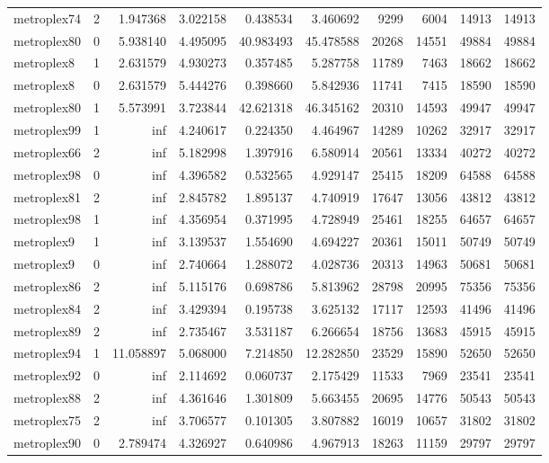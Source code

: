 \begin{longtable}{|l|r|r|r|r|r|r|r|r|r|}
metroplex74 & 2 & 1.947368 & 3.022158 & 0.438534 & 3.460692 & 9299 & 6004 & 14913 & 14913 \\
metroplex80 & 0 & 5.938140 & 4.495095 & 40.983493 & 45.478588 & 20268 & 14551 & 49884 & 49884 \\
metroplex8 & 1 & 2.631579 & 4.930273 & 0.357485 & 5.287758 & 11789 & 7463 & 18662 & 18662 \\
metroplex8 & 0 & 2.631579 & 5.444276 & 0.398660 & 5.842936 & 11741 & 7415 & 18590 & 18590 \\
metroplex80 & 1 & 5.573991 & 3.723844 & 42.621318 & 46.345162 & 20310 & 14593 & 49947 & 49947 \\
metroplex99 & 1 & inf & 4.240617 & 0.224350 & 4.464967 & 14289 & 10262 & 32917 & 32917 \\
metroplex66 & 2 & inf & 5.182998 & 1.397916 & 6.580914 & 20561 & 13334 & 40272 & 40272 \\
metroplex98 & 0 & inf & 4.396582 & 0.532565 & 4.929147 & 25415 & 18209 & 64588 & 64588 \\
metroplex81 & 2 & inf & 2.845782 & 1.895137 & 4.740919 & 17647 & 13056 & 43812 & 43812 \\
metroplex98 & 1 & inf & 4.356954 & 0.371995 & 4.728949 & 25461 & 18255 & 64657 & 64657 \\
metroplex9 & 1 & inf & 3.139537 & 1.554690 & 4.694227 & 20361 & 15011 & 50749 & 50749 \\
metroplex9 & 0 & inf & 2.740664 & 1.288072 & 4.028736 & 20313 & 14963 & 50681 & 50681 \\
metroplex86 & 2 & inf & 5.115176 & 0.698786 & 5.813962 & 28798 & 20995 & 75356 & 75356 \\
metroplex84 & 2 & inf & 3.429394 & 0.195738 & 3.625132 & 17117 & 12593 & 41496 & 41496 \\
metroplex89 & 2 & inf & 2.735467 & 3.531187 & 6.266654 & 18756 & 13683 & 45915 & 45915 \\
metroplex94 & 1 & 11.058897 & 5.068000 & 7.214850 & 12.282850 & 23529 & 15890 & 52650 & 52650 \\
metroplex92 & 0 & inf & 2.114692 & 0.060737 & 2.175429 & 11533 & 7969 & 23541 & 23541 \\
metroplex88 & 2 & inf & 4.361646 & 1.301809 & 5.663455 & 20695 & 14776 & 50543 & 50543 \\
metroplex75 & 2 & inf & 3.706577 & 0.101305 & 3.807882 & 16019 & 10657 & 31802 & 31802 \\
metroplex90 & 0 & 2.789474 & 4.326927 & 0.640986 & 4.967913 & 18263 & 11159 & 29797 & 29797 \\

\end{longtable}
